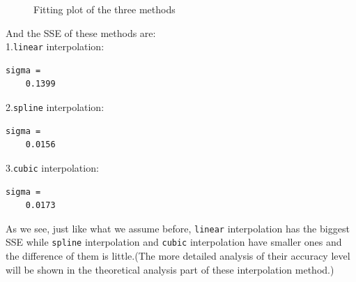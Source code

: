 \documentclass[a4paper]{article}
\begin{document}
\begin{figure}[H]
\centering
{}
\caption{Fitting plot of the three methods}
\end{figure}
And the SSE of these methods are:\\
1.\verb$linear$ interpolation:
\begin{verbatim}
sigma =
    0.1399
\end{verbatim}
2.\verb$spline$ interpolation:
\begin{verbatim}
sigma =
    0.0156
\end{verbatim}
3.\verb$cubic$ interpolation:
\begin{verbatim}
sigma =
    0.0173
\end{verbatim}
As we see, just like what we assume before, \verb$linear$ interpolation has the biggest SSE while \verb$spline$ interpolation and \verb$cubic$ interpolation have smaller ones and the difference of them is little.(The more detailed analysis of their accuracy level will be shown in the theoretical analysis part of these interpolation method.)
\end{document}
